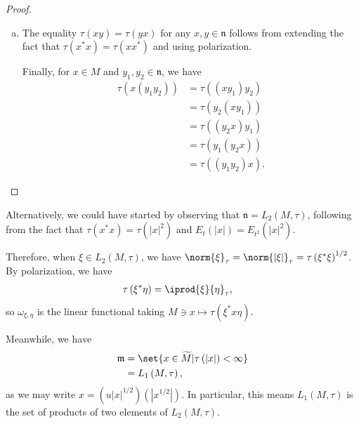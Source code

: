 \documentclass[10pt]{mypackage}
\begin{document}
\begin{proof}
\begin{enumerate}[(a)]
      Since $\tau$ is additive on $ \widetilde{M}_{+} $, then this definition is not ambiguous. Moreover, the extension is linear and self-adjoint.
    \item The equality $\tau\left( xy \right) = \tau\left( yx \right)$ for any $x,y\in \mathfrak{n}$ follows from extending the fact that $\tau\left( x^{\ast}x \right) = \tau\left( xx^{\ast} \right)$ and using polarization.

      Finally, for $x\in M$ and $y_1,y_2\in \mathfrak{n}$, we have
      \begin{align*}
        \tau\left( x\left( y_1y_2 \right) \right) &= \tau\left( \left( xy_1 \right)y_2 \right)\\
                                                  &= \tau\left( y_2\left( xy_1 \right) \right)\\
                                                  &= \tau\left( \left( y_2 x \right)y_1 \right)\\
                                                  &= \tau\left( y_1\left( y_2 x \right) \right)\\
                                                  &= \tau\left( \left( y_1y_2 \right)x \right).
      \end{align*}
  \end{enumerate}
\end{proof}
Alternatively, we could have started by observing that $ \mathfrak{n} = L_2\left( M,\tau \right) $, following from the fact that $\tau\left( x^{\ast}x \right) = \tau\left( \left\vert x \right\vert^2 \right)$ and $E_t\left( \left\vert x \right\vert \right) = E_{t^2}\left( \left\vert x \right\vert^2 \right)$.

Therefore, when $\xi\in L_2\left( M,\tau \right)$, we have $\norm{\xi}_{\tau} = \norm{\left\vert \xi \right\vert}_{\tau} = \tau\left( \xi^{\ast}\xi \right)^{1/2}$. By polarization, we have
\begin{align*}
  \tau\left( \xi^{\ast}\eta \right) &= \iprod{\xi}{\eta}_{\tau},
\end{align*}
so $\omega_{\xi,\eta}$ is the linear functional taking $M\ni x\mapsto \tau\left( \xi^{\ast}x \eta \right)$.

Meanwhile, we have
\begin{align*}
  \mathfrak{m} &= \set{x\in \widetilde{M} | \tau\left( \left\vert x \right\vert \right) < \infty}\\
               &= L_1\left( M,\tau \right),
\end{align*}
as we may write $x = \left( u\left\vert x \right\vert^{1/2} \right)\left( \left\vert x^{1/2} \right\vert \right)$. In particular, this means $L_1\left( M,\tau \right)$ is the set of products of two elements of $L_2\left( M,\tau \right)$.
\end{document}
